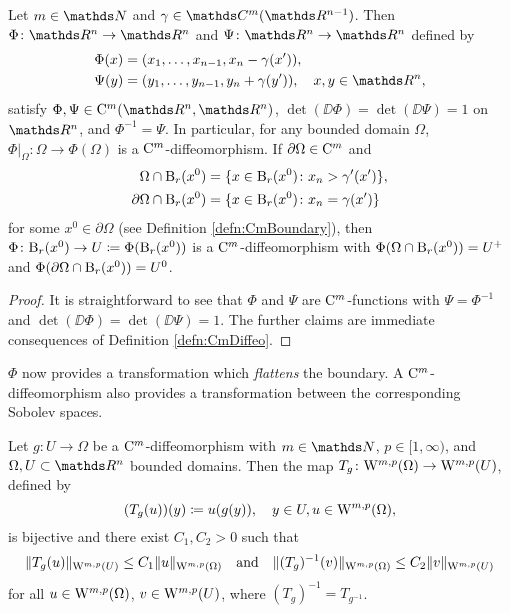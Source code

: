 \begin{lem}
  \label{lem:flattening}
  Let $m \in \N$ and $\gamma \in \C^m(\R^{n - 1})$.
  Then $\Phi \colon \R^n \to \R^n$ and $\Psi \colon \R^n \to \R^n$ defined by
  \begin{align*}
    \Phi(x) &= (x_1,\dots,x_{n - 1}, x_n - \gamma(x')),\\
    \Psi(y) &= (y_1,\dots,y_{n - 1}, y_n + \gamma(y')), \quad x,y \in \R^n,
  \end{align*}
  satisfy $\Phi,\Psi \in \CC^m(\R^n,\R^n)$, $\det(\DD\Phi) = \det(\DD \Psi) =1$ on $\R^n$, and $\Phi^{-1} = \Psi$.
  In particular, for any bounded domain $\Omega$, $\Phi|_\Omega \colon \Omega \to \Phi(\Omega)$ is a $\mathrm{C}^m$\hyp{}diffeomorphism.
  If $\partial \Omega \in \mathrm{C}^m$ and 
  \begin{align*}
    \Omega \cap \mathrm{B}_r(x^0) &= \{ x \in \mathrm{B}_r(x^0) \colon x_n > \gamma'(x')\},\\
    \partial \Omega \cap \mathrm{B}_r(x^0) &= \{ x \in \mathrm{B}_r(x^0) \colon x_n = \gamma(x')\}
  \end{align*}
  for some $x^0 \in \partial \Omega$ (see Definition \ref{defn:CmBoundary}), then $\Phi\colon \mathrm{B}_r(x^0) \to U \coloneqq \Phi(\mathrm{B}_r(x^0))$ is a $\mathrm{C}^m$\hyp{}diffeomorphism with $\Phi(\Omega \cap \mathrm{B}_r(x^0)) = U^+$ and $\Phi(\partial\Omega \cap \mathrm{B}_r(x^0)) = U^0$.
\end{lem}

\begin{proof}
  It is straightforward to see that $\Phi$ and $\Psi$ are $\mathrm{C}^m$-functions with $\Psi = \Phi^{-1}$ and $\det(\DD\Phi) = \det(\DD\Psi) = 1$.
  The further claims are immediate consequences of Definition \ref{defn:CmDiffeo}.
\end{proof}

$\Phi$ now provides a transformation which \emph{flattens} the boundary.
A $\mathrm{C}^m$\hyp{}diffeomorphism also provides a transformation between the corresponding Sobolev spaces.

\begin{prop}
  \label{prop:sobolevTransform}
  Let $g \colon U \to \Omega$ be a $\mathrm{C}^m$\hyp{}diffeomorphism with $m \in \N$, $p \in [1,\infty)$, and $\Omega,U \subset \R^n$ bounded domains.
  Then the map $T_g \colon \mathrm{W}^{m,p}(\Omega) \to \mathrm{W}^{m,p}(U)$, defined by
  $$
  (T_g(u))(y) \coloneqq u(g(y)), \quad y \in U, u \in \mathrm{W}^{m,p}(\Omega),
  $$
  is bijective and there exist $C_1, C_2 > 0$ such that
  $$
  \|T_g(u)\|_{\mathrm{W}^{m,p}(U)} \leq C_1 \|u\|_{\mathrm{W}^{m,p}(\Omega)}
  \quad\text{and}\quad
  \|(T_g)^{-1}(v)\|_{\mathrm{W}^{m,p}(\Omega)} \leq C_2 \|v\|_{\mathrm{W}^{m,p}(U)}
  $$
  for all $u \in \mathrm{W}^{m,p}(\Omega)$, $v \in \mathrm{W}^{m,p}(U)$, where $(T_g)^{-1} = T_{g^{-1}}$.
\end{prop}

